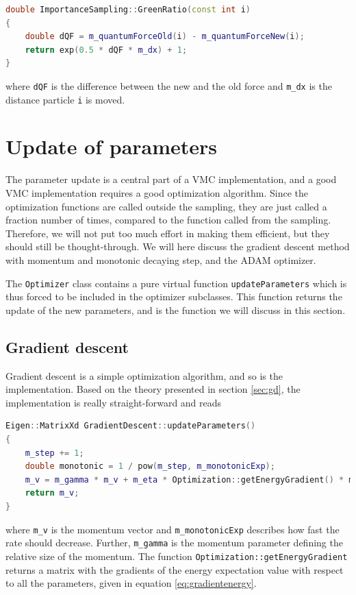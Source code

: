 \begin{lstlisting}[language=c++,caption={Taken from \lstinline{importancesampling.cpp}.}]
double ImportanceSampling::GreenRatio(const int i)
{
	double dQF = m_quantumForceOld(i) - m_quantumForceNew(i);
	return exp(0.5 * dQF * m_dx) + 1;
}
\end{lstlisting}
where \lstinline|dQF| is the difference between the new and the old force and \lstinline|m_dx| is the distance particle \lstinline|i| is moved. 

\section{Update of parameters} \label{sec:update}
The parameter update is a central part of a VMC implementation, and a good VMC implementation requires a good optimization algorithm. Since the optimization functions are called outside the sampling, they are just called a fraction number of times, compared to the function called from the sampling. Therefore, we will not put too much effort in making them efficient, but they should still be thought-through. We will here discuss the gradient descent method with momentum and monotonic decaying step, and the ADAM optimizer. 

The \lstinline|Optimizer| class contains a pure virtual function \lstinline|updateParameters| which is thus forced to be included in the optimizer subclasses. This function returns the update of the new parameters, and is the function we will discuss in this section.

\subsection{Gradient descent}
Gradient descent is a simple optimization algorithm, and so is the implementation. Based on the theory presented in section \ref{sec:gd}, the implementation is really straight-forward and reads
\begin{lstlisting}[language=c++,caption={Taken from \lstinline{gradientdescent.cpp}.}]
Eigen::MatrixXd GradientDescent::updateParameters()
{
	m_step += 1;
	double monotonic = 1 / pow(m_step, m_monotonicExp);
	m_v = m_gamma * m_v + m_eta * Optimization::getEnergyGradient() * monotonic;
	return m_v;
}
\end{lstlisting}
where \lstinline|m_v| is the momentum vector and \lstinline|m_monotonicExp| describes how fast the rate should decrease. Further, \lstinline|m_gamma| is the momentum parameter defining the relative size of the momentum. The function \lstinline|Optimization::getEnergyGradient| returns a matrix with the gradients of the energy expectation value with respect to all the parameters, given in equation \eqref{eq:gradientenergy}.

